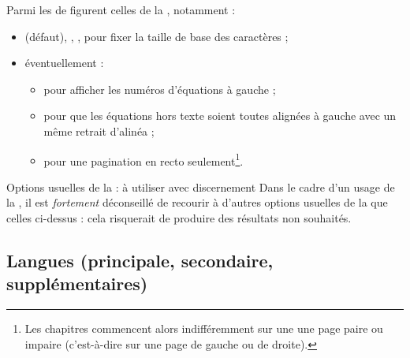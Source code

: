 Parmi les  de \yatcl figurent celles de la ,
notamment :
\begin{itemize}
\item{}%
  \docAuxKey{10pt} (défaut), \docAuxKey{11pt}, \docAuxKey{12pt}, pour fixer
  la taille de base des caractères ;
\item éventuellement :
  \begin{itemize}
  \item{}%
     pour afficher les numéros d'équations à gauche ;
  \item{}%
     pour que les équations hors texte soient toutes
    alignées à gauche avec un même retrait d'alinéa ;
  \item%
     pour une \gls{pagination} en recto
    seulement\footnote{Les chapitres commencent alors indifféremment sur une une
      page paire ou impaire (c'est-à-dire sur une page
      de gauche ou de droite).}.
  \end{itemize}
\end{itemize}
\begin{dbwarning}{Options usuelles de la  : à utiliser avec
    discernement}{}
  Dans le cadre d'un usage de la \yatCl, il est \emph{fortement} déconseillé de
  recourir à d'autres options usuelles de la  que celles
  ci-dessus : cela risquerait de produire des résultats non souhaités.
\end{dbwarning}

%

\subsection{Langues (principale, secondaire, supplémentaires)}
\label{sec-langues}%
%
%
%
%
%


